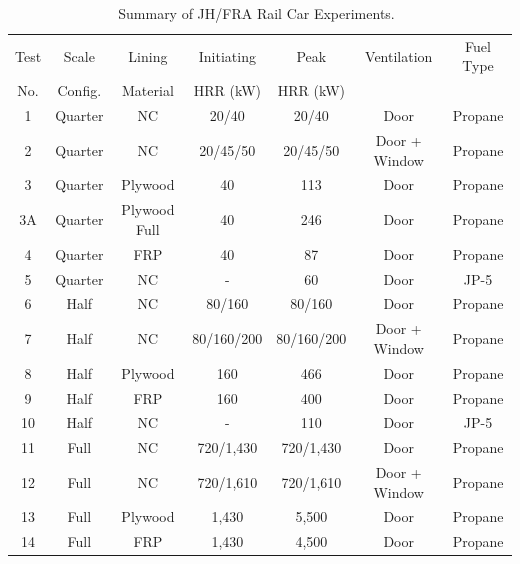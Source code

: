 \begin{table}[!htb]
\caption[Summary of JH/FRA Rail Car Experiments]{Summary of JH/FRA Rail Car Experiments.~\cite{Hodges:FRA22}}
\begin{center}
\begin{tabular}{|c|c|c|c|c|c|c|}
\hline
Test & Scale   & Lining   &  Initiating & Peak       & Ventilation   & Fuel Type \\
No.  & Config. & Material &  HRR (kW)   & HRR (kW)   &               &           \\ \hline \hline
1    & Quarter & NC       & 20/40       & 20/40      & Door          & Propane   \\ \hline
2    & Quarter & NC       & 20/45/50    & 20/45/50   & Door + Window & Propane   \\ \hline
3    & Quarter & Plywood  & 40          & 113        & Door          & Propane   \\ \hline
3A    & Quarter & Plywood Full  & 40          & 246        & Door          & Propane   \\ \hline
4    & Quarter & FRP      & 40          & 87         & Door          & Propane   \\ \hline
5    & Quarter & NC       & -           & 60         & Door          & JP-5      \\ \hline
6    & Half    & NC       & 80/160      & 80/160     & Door          & Propane   \\ \hline
7    & Half    & NC       & 80/160/200  & 80/160/200 & Door + Window & Propane   \\ \hline
8    & Half    & Plywood  & 160         & 466        & Door          & Propane   \\ \hline
9    & Half    & FRP      & 160         & 400        & Door          & Propane   \\ \hline
10   & Half    & NC       & -           & 110        & Door          & JP-5      \\ \hline
11   & Full    & NC       & 720/1,430   & 720/1,430  & Door          & Propane   \\ \hline
12   & Full    & NC       & 720/1,610   & 720/1,610  & Door + Window & Propane   \\ \hline
13   & Full    & Plywood  & 1,430       & 5,500      & Door          & Propane   \\ \hline
14   & Full    & FRP      & 1,430       & 4,500      & Door          & Propane   \\ \hline

\end{tabular}
\end{center}
\label{JH_FRA_Matrix}
\end{table}

